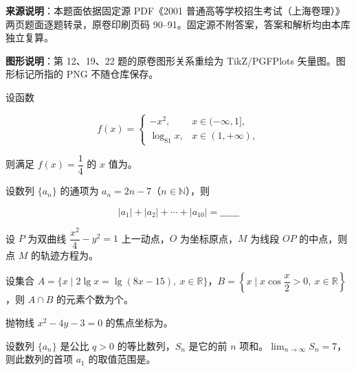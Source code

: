 


\begin{gktip}
\textbf{来源说明}：本题面依据固定源 PDF《2001 普通高等学校招生考试（上海卷理）》两页题面逐题转录，原卷印刷页码 90–91。固定源不附答案，答案和解析均由本库独立复算。

\textbf{图形说明}：第 12、19、22 题的原卷图形关系重绘为 TikZ/PGFPlots 矢量图。图形标记所指的 PNG 不随仓库保存。
\end{gktip}


\begin{question}
设函数

\nopagebreak[4]
\[
f(x)=
\begin{cases}
-x^2,&x\in(-\infty,1],\\
\log_{81}x,&x\in(1,+\infty),
\end{cases}
\]

则满足 $f(x)=\dfrac14$ 的 $x$ 值为\gkblank{}。

\end{question}
\begin{question}
设数列 $\{a_n\}$ 的通项为 $a_n=2n-7$（$n\in\mathbb N$），则

\nopagebreak[4]
\[
|a_1|+|a_2|+\cdots+|a_{10}|=\_\_\_\_\_\_
\]

\end{question}
\begin{question}
设 $P$ 为双曲线 $\dfrac{x^2}{4}-y^2=1$ 上一动点，$O$ 为坐标原点，$M$ 为线段 $OP$ 的中点，则点 $M$ 的轨迹方程为\gkblank{}。

\end{question}
\begin{question}
设集合 $A=\{x\mid 2\lg x=\lg(8x-15),\ x\in\mathbb R\}$，$B=\left\{x\mid x\cos\dfrac{x}{2}>0,\ x\in\mathbb R\right\}$，则 $A\cap B$ 的元素个数为\gkblank{}个。

\end{question}
\begin{question}
抛物线 $x^2-4y-3=0$ 的焦点坐标为\gkblank{}。

\end{question}
\begin{question}
设数列 $\{a_n\}$ 是公比 $q>0$ 的等比数列，$S_n$ 是它的前 $n$ 项和。$\displaystyle\lim_{n\to\infty}S_n=7$，则此数列的首项 $a_1$ 的取值范围是\gkblank{}。

\end{question}
